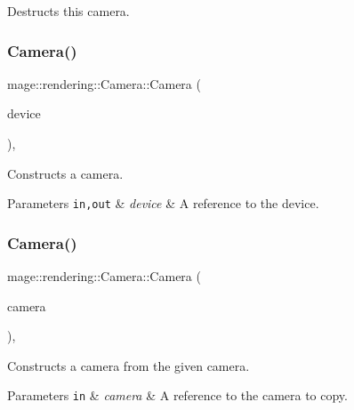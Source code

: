 Destructs this camera. \mbox{\label{classmage_1_1rendering_1_1_camera_a872aafc40d35c1481a4147c73fdbc00a}} 
\subsubsection{\texorpdfstring{Camera()}{Camera()}\hspace{0.1cm}{\footnotesize\ttfamily [1/3]}}
{\footnotesize\ttfamily mage\+::rendering\+::\+Camera\+::\+Camera (\begin{DoxyParamCaption}\item[{I\+D3\+D11\+Device \&}]{device }\end{DoxyParamCaption})\hspace{0.3cm}{\ttfamily [explicit]}, {\ttfamily [protected]}}

Constructs a camera.


\begin{DoxyParams}[1]{Parameters}
\mbox{\tt in,out}  & {\em device} & A reference to the device. \\
\hline
\end{DoxyParams}
\mbox{\label{classmage_1_1rendering_1_1_camera_ac4e1e9f230416c0aaea12d2b0fff02c1}} 
\subsubsection{\texorpdfstring{Camera()}{Camera()}\hspace{0.1cm}{\footnotesize\ttfamily [2/3]}}
{\footnotesize\ttfamily mage\+::rendering\+::\+Camera\+::\+Camera (\begin{DoxyParamCaption}\item[{const \mbox{\hyperlink{classmage_1_1rendering_1_1_camera}{Camera}} \&}]{camera }\end{DoxyParamCaption})\hspace{0.3cm}{\ttfamily [protected]}, {\ttfamily [delete]}}

Constructs a camera from the given camera.


\begin{DoxyParams}[1]{Parameters}
\mbox{\tt in}  & {\em camera} & A reference to the camera to copy. \\
\hline
\end{DoxyParams}
\mbox{\label{classmage_1_1rendering_1_1_camera_a7ac683929b75589e3f396a76a6afb9cf}} 
